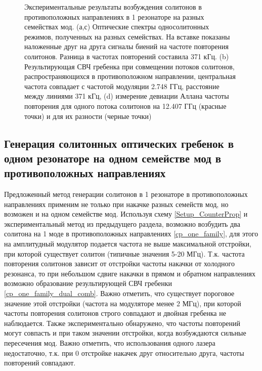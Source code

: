 \begin{figure}[ht]
\begin{minipage}[ht]{1\linewidth}
\end{minipage}
\caption{Экспериментальные результаты возбуждения солитонов в противоположных направлениях в 1 резонаторе на разных семействах мод. (а,с) Оптические спектры односолитонных режимов, полученных на разных семействах. На вставке показаны наложенные друг на друга сигналы биений на частоте повторения солитонов. Разница в частотах повторений составила 371 кГц. (b) Результирующая СВЧ гребенка при совмещении потоков солитонов, распространяющихся в противоположном направлении, центральная частота совпадает с частотой модуляции 2.748 ГГц, расстояние между линиями 371 кГц, (d) измерение девиации Аллана частоты повторения для одного потока солитонов на 12.407 ГГц (красные точки) и для их разности (черные точки)}
\label{counter_prop_results}
\end{figure}

\subsection{Генерация солитонных оптических гребенок в одном резонаторе на одном семействе мод в противоположных направлениях}

Предложенный метод генерации солитонов в 1 резонаторе в противоположных направлениях применим не только при накачке разных семейств мод, но возможен и на одном семействе мод. Используя схему \ref{Setup_CounterProp} и экспериментальный метод из предыдущего раздела, возможно возбудить два солитона на 1 моде в противоположных направлениях \ref{cp_one_family}, для этого на амплитудный модулятор подается частота не выше максимальной отстройки, при которой существует солитон (типичные значения 5-20 МГц). Т.к. частота повторения солитонов зависит от отстройки частоты накачки от холодного резонанса, то при небольшом сдвиге накачки в прямом и обратном направлениях возможно образование результирующей СВЧ гребенки \ref{cp_one_family_dual_comb}. Важно отметить, что существует пороговое значение этой отстройки (частота на модуляторе менее 2 МГц), при которой частоты повторения солитонов строго совпадают и двойная гребенка не наблюдается. Также экспериментально обнаружено, что частоты повторений могут совпасть и при таком значении отстройки, когда возбуждаются сильные пересечения мод. Важно отметить, что использования одного лазера недостаточно, т.к. при 0 отстройке накачек друг относительно друга, частоты повторений совпадают.

